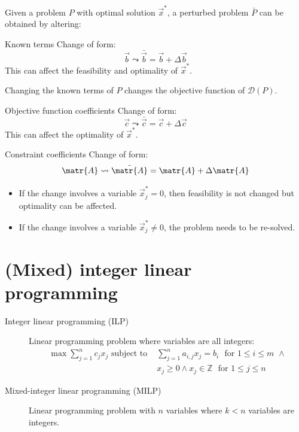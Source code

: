 Given a problem $P$ with optimal solution $\vec{x}^*$, a perturbed problem $\bar{P}$ can be obtained by altering:
\begin{descriptionlist}
    \item[Known terms] 
        Change of form: 
        \[ \vec{b} \leadsto \bar{\vec{b}} = \vec{b} + \Delta \vec{b} \]
        This can affect the feasibility and optimality of $\vec{x}^*$.

        \begin{remark}
            Changing the known terms of $P$ changes the objective function of $\mathcal{D}(P)$.
        \end{remark}

    \item[Objective function coefficients] 
        Change of form: 
        \[ \vec{c} \leadsto \bar{\vec{c}} = \vec{c} + \Delta \vec{c} \]
        This can affect the optimality of $\vec{x}^*$.
    
    \item[Constraint coefficients] 
        Change of form: 
        \[ \matr{A} \leadsto \bar{\matr{A}} = \matr{A} + \Delta \matr{A} \]
        \begin{itemize}
            \item If the change involves a variable $\vec{x}^*_j = 0$, then feasibility is not changed but optimality can be affected.
            \item If the change involves a variable $\vec{x}^*_j \neq 0$, the problem needs to be re-solved.
        \end{itemize}
\end{descriptionlist}



\section{(Mixed) integer linear programming}

\begin{description}
    \item[Integer linear programming (ILP)] 
        Linear programming problem where variables are all integers:
        \[ 
            \begin{split}
                \max \sum_{j=1}^{n} c_j x_j \text{ subject to } &\sum_{j=1}^{n} a_{i,j} x_j = b_i \,\,\text{ for } 1 \leq i \leq m \,\,\land \\
                    & x_j \geq 0 \land x_j \in \mathbb{Z} \,\,\text{ for } 1 \leq j \leq n
            \end{split}
        \]

    \item[Mixed-integer linear programming (MILP)] 
        Linear programming problem with $n$ variables where $k < n$ variables are integers.
\end{description}

